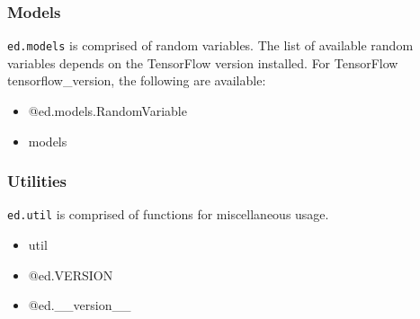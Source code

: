 \subsubsection{Models}

\texttt{ed.models} is comprised of random variables.
The list of available random variables depends on the TensorFlow
version installed. For TensorFlow {{tensorflow_version}}, the
following are available:

\begin{itemize}
  \item @{ed.models.RandomVariable}
  \item {{models}}
\end{itemize}

\subsubsection{Utilities}

\texttt{ed.util} is comprised of functions for miscellaneous usage.

\begin{itemize}
  \item {{util}}
  \item @{ed.VERSION}
  \item @{ed.__version__}
\end{itemize}
